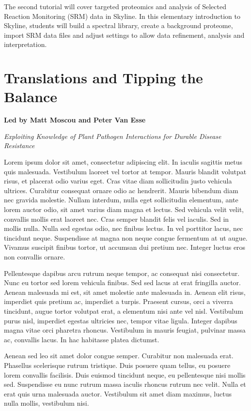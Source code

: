 \documentclass[12pt,]{book}
\theoremstyle{definition}
\theoremstyle{definition}
\theoremstyle{remark}
\begin{document}
The second tutorial will cover targeted proteomics and analysis of
Selected Reaction Monitoring (SRM) data in Skyline. In this elementary
introduction to Skyline, students will build a spectral library, create
a background proteome, import SRM data files and adjust settings to
allow data refinement, analysis and interpretation.

\chapter*{Translations and Tipping the
Balance}\label{translations-and-tipping-the-balance}

\textbf{Led by Matt Moscou and Peter Van Esse}

\emph{Exploiting Knowledge of Plant Pathogen Interactions for Durable
Disease Resistance}

Lorem ipsum dolor sit amet, consectetur adipiscing elit. In iaculis
sagittis metus quis malesuada. Vestibulum laoreet vel tortor at tempor.
Mauris blandit volutpat risus, et placerat odio varius eget. Cras vitae
diam sollicitudin justo vehicula ultrices. Curabitur consequat ornare
odio ac hendrerit. Mauris bibendum diam nec gravida molestie. Nullam
interdum, nulla eget sollicitudin elementum, ante lorem auctor odio, sit
amet varius diam magna et lectus. Sed vehicula velit velit, convallis
mollis erat laoreet nec. Cras semper blandit felis vel iaculis. Sed in
mollis nulla. Nulla sed egestas odio, nec finibus lectus. In vel
porttitor lacus, nec tincidunt neque. Suspendisse at magna non neque
congue fermentum at ut augue. Vivamus suscipit finibus tortor, ut
accumsan dui pretium nec. Integer luctus eros non convallis ornare.

Pellentesque dapibus arcu rutrum neque tempor, ac consequat nisi
consectetur. Nunc eu tortor sed lorem vehicula finibus. Sed sed lacus at
erat fringilla auctor. Aenean malesuada mi est, sit amet molestie ante
malesuada in. Aenean elit risus, imperdiet quis pretium ac, imperdiet a
turpis. Praesent cursus, orci a viverra tincidunt, augue tortor volutpat
erat, a elementum nisi ante vel nisl. Vestibulum purus nisl, imperdiet
egestas ultricies nec, tempor vitae ligula. Integer dapibus magna vitae
orci pharetra rhoncus. Vestibulum in mauris feugiat, pulvinar massa ac,
convallis lacus. In hac habitasse platea dictumst.

Aenean sed leo sit amet dolor congue semper. Curabitur non malesuada
erat. Phasellus scelerisque rutrum tristique. Duis posuere quam tellus,
eu posuere lorem convallis facilisis. Duis euismod tincidunt neque, eu
pellentesque nisi mollis sed. Suspendisse eu nunc rutrum massa iaculis
rhoncus rutrum nec velit. Nulla et erat quis urna malesuada auctor.
Vestibulum sit amet diam maximus, luctus nulla mollis, vestibulum nisi.
\end{document}
